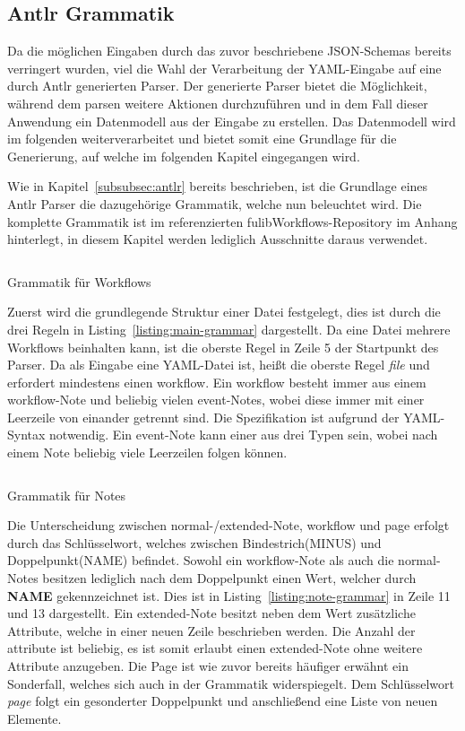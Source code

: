 \subsection{Antlr Grammatik}\label{subsec:antlr-grammatik}
Da die möglichen Eingaben durch das zuvor beschriebene JSON-Schemas bereits verringert wurden, viel die Wahl der Verarbeitung der YAML-Eingabe auf eine durch Antlr generierten Parser.
Der generierte Parser bietet die Möglichkeit, während dem parsen weitere Aktionen durchzuführen und in dem Fall dieser Anwendung ein Datenmodell aus der Eingabe zu erstellen.
Das Datenmodell wird im folgenden weiterverarbeitet und bietet somit eine Grundlage für die Generierung, auf welche im folgenden Kapitel eingegangen wird.

Wie in Kapitel~\ref{subsubsec:antlr} bereits beschrieben, ist die Grundlage eines Antlr Parser die dazugehörige Grammatik, welche nun beleuchtet wird.
Die komplette Grammatik ist im referenzierten fulibWorkflows-Repository im Anhang hinterlegt, in diesem Kapitel werden lediglich Ausschnitte daraus verwendet.

\begin{listing}[!ht]
    \inputminted[firstnumber=5]{antlr-java}{listings/3.1.3/Main.g4}
    \caption{Grammatik für Workflows}
    \label{listing:main-grammar}
\end{listing}

Zuerst wird die grundlegende Struktur einer Datei festgelegt, dies ist durch die drei Regeln in Listing~\ref{listing:main-grammar} dargestellt.
Da eine Datei mehrere Workflows beinhalten kann, ist die oberste Regel in Zeile 5 der Startpunkt des Parser.
Da als Eingabe eine YAML-Datei ist, heißt die oberste Regel \textit{file} und erfordert mindestens einen workflow.
Ein workflow besteht immer aus einem workflow-Note und beliebig vielen event-Notes, wobei diese immer mit einer Leerzeile von einander getrennt sind.
Die Spezifikation ist aufgrund der YAML-Syntax notwendig.
Ein event-Note kann einer aus drei Typen sein, wobei nach einem Note beliebig viele Leerzeilen folgen können.

\begin{listing}[!ht]
    \inputminted[firstnumber=11]{antlr-java}{listings/3.1.3/Note.g4}
    \caption{Grammatik für Notes}
    \label{listing:note-grammar}
\end{listing}

Die Unterscheidung zwischen normal-/extended-Note, workflow und page erfolgt durch das Schlüsselwort, welches zwischen Bindestrich(MINUS) und Doppelpunkt(NAME) befindet.
Sowohl ein workflow-Note als auch die normal-Notes besitzen lediglich nach dem Doppelpunkt einen Wert, welcher durch \textbf{NAME} gekennzeichnet ist.
Dies ist in Listing~\ref{listing:note-grammar} in Zeile 11 und 13 dargestellt.
Ein extended-Note besitzt neben dem Wert zusätzliche Attribute, welche in einer neuen Zeile beschrieben werden.
Die Anzahl der attribute ist beliebig, es ist somit erlaubt einen extended-Note ohne weitere Attribute anzugeben.
Die Page ist wie zuvor bereits häufiger erwähnt ein Sonderfall, welches sich auch in der Grammatik widerspiegelt.
Dem Schlüsselwort \textit{page} folgt ein gesonderter Doppelpunkt und anschließend eine Liste von neuen Elemente.

